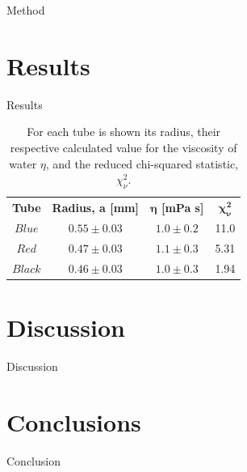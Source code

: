 \documentclass[twocolumn]{revtex4}
\begin{document}
Method

\vspace{-3ex}
\section{Results}
\vspace{-2ex}

Results

\begin{table}[h!]
\centering
\begin{tabular}{c@{\hskip 20pt}c@{\hskip 20pt}c@{\hskip 20pt}c} 
 \hline
 \textbf{Tube} & \textbf{Radius, a [mm]} & \textbf{$\boldsymbol{\eta}$ [mPa {s}]} & \textbf{$\boldsymbol{\chi^2_{\nu}}$} \\ [0.5ex] 
 $Blue$ &$0.55\pm0.03$ & $1.0\pm0.2$ & 11.0 \\ 
 $Red$ & $0.47\pm0.03$ & $1.1\pm0.3$ & 5.31 \\
 $Black$ & $0.46\pm0.03$ & $1.0\pm0.3$ & 1.94 \\
 
 \hline
\end{tabular}
\caption{For each tube is shown its radius, their respective calculated value for the viscosity of water $\eta$, and the reduced chi-squared statistic, $\chi^2_{\nu}$.}
\label{table:1}
\end{table}

\vspace{-3ex}
\section{Discussion}
\vspace{-2ex}

Discussion

\vspace{-5ex}
\section{Conclusions}
\vspace{-2ex}

Conclusion
\end{document}
